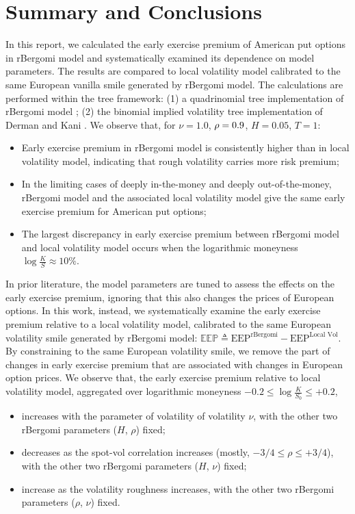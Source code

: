\documentclass[12pt]{article}
\numberwithin{equation}{section}
\begin{document}
\section{Summary and Conclusions}
In this report, we calculated the early exercise premium of American put options in rBergomi model and systematically examined its dependence on model parameters. The results are compared to local volatility model calibrated to the same European vanilla smile generated by rBergomi model. The calculations are performed within the tree framework: (1) a quadrinomial tree implementation of rBergomi model \cite{horvath}; (2) the binomial implied volatility tree implementation of Derman and Kani \cite{derman}. We observe that, for $\nu=1.0$, $\rho=\-0.9$, $H=0.05$, $T=1$:
\begin{itemize}[noitemsep]
\item Early exercise premium in rBergomi model is consistently higher than in local volatility model, indicating that rough volatility carries more risk premium;
\item In the limiting cases of deeply in-the-money and deeply out-of-the-money, rBergomi model and the associated local volatility model give the same early exercise premium for American put options;
\item The largest discrepancy in early exercise premium between rBergomi model and local volatility model occurs when the logarithmic moneyness $\log\frac{K}{S}\approx 10\%$.
\end{itemize}
In prior literature, the model parameters are tuned to assess the effects on the early exercise premium, ignoring that this also changes the prices of European options. In this work, instead, we systematically examine the early exercise premium relative to a local volatility model, calibrated to the same European volatility smile generated by rBergomi model: $\mathbb{EEP} \triangleq \text{EEP}^{\text{rBergomi}} - \text{EEP}^{\text{Local Vol}}$. By constraining to the same European volatility smile, we remove the part of changes in early exercise premium that are associated with changes in European option prices. We observe that, the early exercise premium relative to local volatility model, aggregated over logarithmic moneyness $-0.2\le\log \frac{K}{S_0}\le +0.2$, 
\begin{itemize}[noitemsep]
\item increases with the parameter of volatility of volatility $\nu$, with the other two rBergomi parameters ($H$, $\rho$) fixed;
\item decreases as the spot-vol correlation increases (mostly, $-3/4\le \rho \le +3/4$), with the other two rBergomi parameters ($H$, $\nu$) fixed;
\item increase as the volatility roughness increases, with the other two rBergomi parameters ($\rho$, $\nu$) fixed.
\end{itemize}
\end{document}

